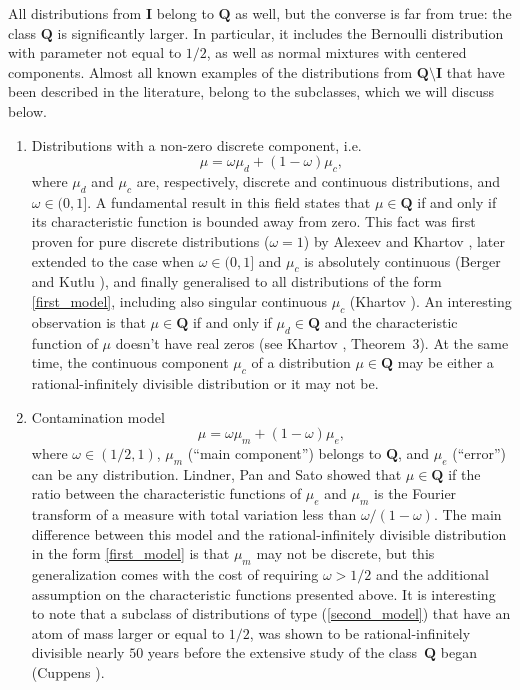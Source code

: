 \documentclass[numbers,webpdf,imaiai]{ima-authoring-template}%
\theoremstyle{thmstyletwo}%
\newcommand{\Q}{\pmb{Q}}
\newcommand{\ID}{\pmb{I}}
\newcommand{\w}{\omega}
\numberwithin{equation}{section}
\begin{document}
All distributions from $\ID$ belong to $\Q$ as well, but the converse is far from true: the class $\Q$ is significantly larger. In particular, it includes the Bernoulli distribution with parameter not equal to $1/2$, as well as normal mixtures with centered components. Almost all known examples of the distributions from $\Q \setminus \ID $ that have been described in the literature,  belong to the subclasses, which we will discuss below. 
\begin{enumerate}
    \item Distributions with a non-zero discrete component, i.e.
    \begin{equation} \label{first_model}
        \mu = \w \mu_d + (1 - \w) \mu_c,
    \end{equation}
where $\mu_d$ and $\mu_c$ are, respectively, discrete and continuous distributions, and $\w \in (0, 1]$. A fundamental result in this field states that  $\mu \in \Q$   if and only if its characteristic function is bounded away from zero.  This fact was first proven for pure discrete distributions ($\w=1$) by Alexeev and Khartov \citep{AK2023}, later extended to the case when $\w \in (0,1]$ and $\mu_c$ is  absolutely continuous  (Berger and Kutlu \citep{BK2023}), and finally generalised to all distributions of the form \eqref{first_model}, including also singular continuous $\mu_c$ (Khartov \citep{Khartov2026}). 
 An interesting observation is that $\mu \in \Q$  if and only if  $\mu_d \in \Q$  and   the characteristic function of $\mu$ doesn't have real zeros (see Khartov \citep{Khartov2026}, Theorem~3). At the same time, the continuous component $\mu_c$ of a distribution \(\mu \in \Q\) may be either a rational-infinitely divisible distribution or it may not be.
     \item 
    Contamination model
        \begin{equation}\label{second_model}
        \mu = \w \mu_m + (1 - \w)\mu_e,
    \end{equation}
    where $\w \in (1/2, 1)$, 
 $\mu_m$ (``main component'') belongs to $\Q$, and $\mu_e$ (``error'') can be any distribution.  Lindner, Pan and Sato \citep{LPS2018} showed that \(\mu \in \Q\) if  the ratio between the characteristic functions of \(\mu_e\) and \(\mu_m\) is the Fourier transform of a measure with total variation less than \(\w/(1-\w)\).  The main difference  between this model and the rational-infinitely divisible distribution in the form \eqref{first_model}  is that \(\mu_m\) may not be discrete, but this generalization comes with the cost of requiring  \(\w>1/2\) and the additional assumption on the characteristic functions presented above.  It is interesting to note that a subclass of distributions of type (\ref{second_model}) that  have an atom of mass larger or equal to $1/2$, was shown to be rational-infinitely divisible nearly $50$ years before the extensive study of the class~\(\Q\) began (Cuppens \citep{Cuppens1970}).
\end{enumerate}
\end{document}
